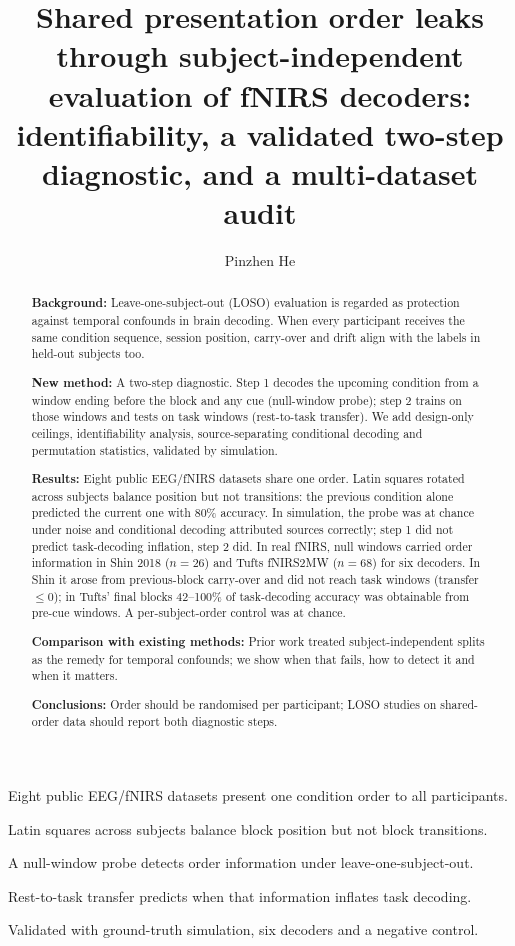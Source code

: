 \documentclass[preprint,11pt]{elsarticle}
\begin{document}
\begin{frontmatter}

\title{Shared presentation order leaks through subject-independent evaluation of fNIRS decoders: identifiability, a validated two-step diagnostic, and a multi-dataset audit}

\author[aff1]{Pinzhen He}
\address[aff1]{Independent Researcher, Tokyo, Japan}

\begin{abstract}
\textbf{Background:} Leave-one-subject-out (LOSO) evaluation is regarded as protection against temporal confounds in brain decoding. When every participant receives the same condition sequence, session position, carry-over and drift align with the labels in held-out subjects too.

\textbf{New method:} A two-step diagnostic. Step 1 decodes the upcoming condition from a window ending before the block and any cue (null-window probe); step 2 trains on those windows and tests on task windows (rest-to-task transfer). We add design-only ceilings, identifiability analysis, source-separating conditional decoding and permutation statistics, validated by simulation.

\textbf{Results:} Eight public EEG/fNIRS datasets share one order. Latin squares rotated across subjects balance position but not transitions: the previous condition alone predicted the current one with 80\% accuracy. In simulation, the probe was at chance under noise and conditional decoding attributed sources correctly; step 1 did not predict task-decoding inflation, step 2 did. In real fNIRS, null windows carried order information in Shin 2018 ($n=26$) and Tufts fNIRS2MW ($n=68$) for six decoders. In Shin it arose from previous-block carry-over and did not reach task windows (transfer $\le 0$); in Tufts' final blocks 42--100\% of task-decoding accuracy was obtainable from pre-cue windows. A per-subject-order control was at chance.

\textbf{Comparison with existing methods:} Prior work treated subject-independent splits as the remedy for temporal confounds; we show when that fails, how to detect it and when it matters.

\textbf{Conclusions:} Order should be randomised per participant; LOSO studies on shared-order data should report both diagnostic steps.
\end{abstract}

\begin{highlights}
\item Eight public EEG/fNIRS datasets present one condition order to all participants.
\item Latin squares across subjects balance block position but not block transitions.
\item A null-window probe detects order information under leave-one-subject-out.
\item Rest-to-task transfer predicts when that information inflates task decoding.
\item Validated with ground-truth simulation, six decoders and a negative control.
\end{highlights}


\end{frontmatter}
\end{document}
